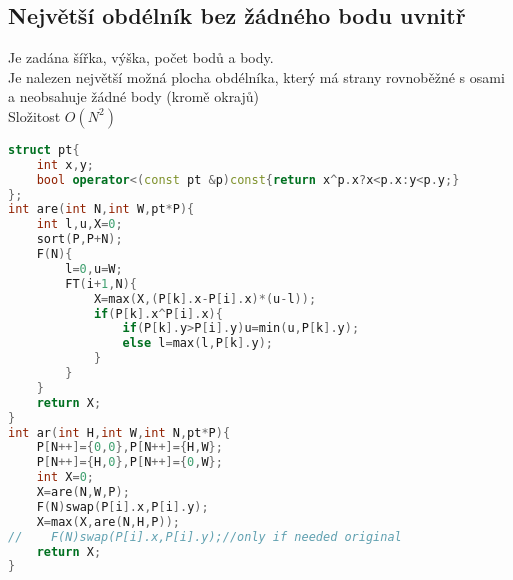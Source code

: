 \documentclass[11pt]{article}
\begin{document}
\subsection{Největší obdélník bez žádného bodu uvnitř}
Je zadána šířka, výška, počet bodů a body.
\\Je nalezen největší možná plocha obdélníka, který má strany rovnoběžné s osami a neobsahuje žádné body (kromě okrajů)
\\Složitost $O(N^2)$
\begin{lstlisting}[language=C++]
struct pt{
    int x,y;
    bool operator<(const pt &p)const{return x^p.x?x<p.x:y<p.y;}
};
int are(int N,int W,pt*P){
    int l,u,X=0;
    sort(P,P+N);
    F(N){
        l=0,u=W;
        FT(i+1,N){
            X=max(X,(P[k].x-P[i].x)*(u-l));
            if(P[k].x^P[i].x){
                if(P[k].y>P[i].y)u=min(u,P[k].y);
                else l=max(l,P[k].y);
            }
        }
    }
    return X;
}
int ar(int H,int W,int N,pt*P){
    P[N++]={0,0},P[N++]={H,W};
    P[N++]={H,0},P[N++]={0,W};
    int X=0;
    X=are(N,W,P);
    F(N)swap(P[i].x,P[i].y);
    X=max(X,are(N,H,P));
//    F(N)swap(P[i].x,P[i].y);//only if needed original
    return X;
}
\end{lstlisting}
\end{document}
